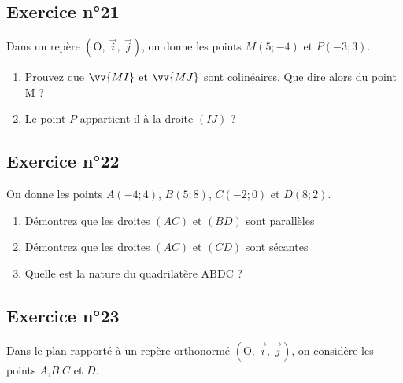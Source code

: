 \documentclass[12pt,a4paper]{article}
\def\Oij{$\left(\text{O},~\vec{i},~\vec{j}\right)$}
\begin{document}
\subsection*{Exercice n°21}

Dans un repère \Oij{}, on donne les points $M(5;-4)$ et $P(-3;3)$.

\begin{enumerate}
    \item Prouvez que $\vv{MI}$ et $\vv{MJ}$ sont colinéaires. Que dire alors du point M ?
    \item Le point $P$ appartient-il à la droite $(IJ)$ ?
\end{enumerate}

\subsection*{Exercice n°22}

On donne les points $A(-4;4)$, $B(5;8)$, $C(-2;0)$ et $D(8;2)$.

\begin{enumerate}
    \item Démontrez que les droites $(AC)$ et $(BD)$ sont parallèles
    \item Démontrez que les droites $(AC)$ et $(CD)$ sont sécantes
    \item Quelle est la nature du quadrilatère ABDC ?
\end{enumerate}

\subsection*{Exercice n°23}

Dans le plan rapporté à un repère orthonormé \Oij{}, on considère les points $A$,$B$,$C$ et $D$.

\begin{center}
\end{center}
\end{document}

